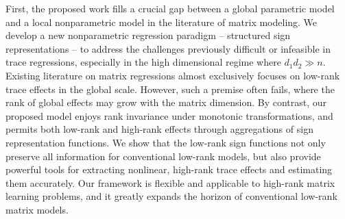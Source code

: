 \documentclass[aos]{imsart}
\theoremstyle{definition}
\begin{document}
First, the proposed work fills a crucial gap between a global parametric model and a local nonparametric model in the literature of matrix modeling. We develop a new nonparametric regression paradigm -- structured sign representations -- to address the challenges previously difficult or infeasible in trace regressions, especially in the high dimensional regime where $d_1d_2\gg n$. Existing literature on matrix regressions almost exclusively focuses on low-rank trace effects in the global scale. However, such a premise often fails, where the rank of global effects may grow with the matrix dimension. By contrast, our proposed model enjoys rank invariance under monotonic transformations, and permits both low-rank and high-rank effects through aggregations of sign representation functions. We show that the low-rank sign functions not only preserve all information for conventional low-rank models, but also provide powerful tools for extracting nonlinear, high-rank trace effects and estimating them accurately. Our framework is flexible and applicable to high-rank matrix learning problems, and it greatly expands the horizon of conventional low-rank matrix models.
\end{document}
